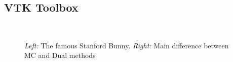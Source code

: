 

\subsection{VTK Toolbox}
\begin{figure}
\centering
   \\
   \caption{\textit{Left:} The famous Stanford Bunny. \textit{Right:} Main difference between MC and Dual methods }
\end{figure}

